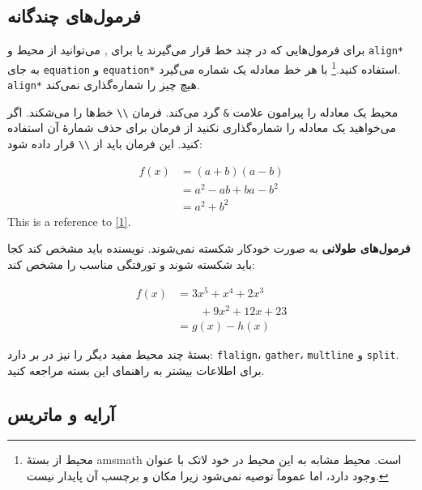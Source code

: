 \subsection{فرمول‌های چندگانه}

برای فرمول‌هایی که در چند خط قرار می‌گیرند یا برای 
 ,
می‌توانید از محیط  و \verb|align*| به جای  \texttt{equation} و \texttt{equation*} استفاده کنید.\footnote{محیط   از بستۀ  \textsf{amsmath} است. محیط مشابه به  این محیط در خود لاتک با عنوان  وجود دارد، اما عموماً توصیه نمی‌شود زیرا مکان و برچسب آن پایدار نیست.} 
با  هر خط معادله یک شماره می‌گیرد. \verb|align*| هیچ چیز را شماره‌گذاری نمی‌کند.

محیط  یک معادله را  پیرامون علامت \verb|&| گرد می‌کند.
فرمان \verb|\\| خط‌ها را می‌شکند. اگر می‌خواهید یک معادله را شماره‌گذاری نکنید از فرمان  برای حذف شمارهٔ آن استفاده کنید. این فرمان باید 
از \verb|\\| قرار داده شود:
\begin{example}
\begin{align}
f(x) &= (a+b)(a-b) \label{1}\\
     &= a^2-ab+ba-b^2  \\ 
     &= a^2+b^2 \tag{wrong}
\end{align}
This is a reference to \eqref{1}.
\end{example}

\textbf{فرمول‌های طولانی} 
به صورت خودکار  شکسته نمی‌شوند. نویسنده باید مشخص کند کجا باید شکسته شوند و تورفتگی مناسب را مشخص کند:
\begin{example}
\begin{align}
f(x) &= 3x^5 + x^4 + 2x^3 
                \nonumber \\
     &\qquad + 9x^2 + 12x + 23 \\
     &= g(x) - h(x)
\end{align}
\end{example}
بستۀ  چند محیط مفید دیگر را نیز در بر دارد: \verb|flalign|،
\verb|gather|، \verb|multline| و \verb|split|. برای اطلاعات بیشتر به راهنمای این بسته مراجعه کنید.
\subsection{آرایه و ماتریس} \label{sec:arraymat}

